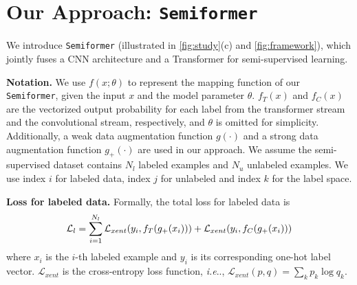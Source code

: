 \documentclass[runningheads]{llncs}
\makeatletter
\DeclareRobustCommand\onedot{\futurelet\@let@token\@onedot}
\def\@onedot{\ifx\@let@token.\else.\null\fi\xspace}
\def\ie{\emph{i.e}\onedot} \def\Ie{\emph{I.e}\onedot}
\newcommand{\fakeparagraph}[1]{\textbf{#1}}
\newcommand*{\system}{\texttt{Semiformer}\@\xspace}
\makeatother
\begin{document}
\section{Our Approach: \system}

We introduce {\system} (illustrated in \cref{fig:study}(c) and \cref{fig:framework}), which jointly fuses a CNN architecture and a Transformer for semi-supervised learning.

\fakeparagraph{Notation.} We use $f(x; \theta)$ to represent the mapping function of our \system, given the input $x$ and the model parameter $\theta$. $f_T(x)$ and $f_C(x)$ are the vectorized output probability for each label from the transformer stream and the convolutional stream, respectively, and $\theta$ is omitted for simplicity.  Additionally, a weak data augmentation function $g(\cdot)$ and a strong data augmentation function $g_+(\cdot)$ are used in our approach. We assume the semi-supervised dataset contains $N_l$ labeled examples and $N_u$ unlabeled examples. We use index $i$ for labeled data, index $j$ for unlabeled and index $k$ for the label space. 

\fakeparagraph{Loss for labeled data.} Formally, the total loss for labeled data is
\begin{equation}
\label{eq:new_loss1}\small
{\mathcal L}_l = \sum_{i=1}^{N_l}\mathcal L_{xent}(y_i,f_T(g_+(x_i)))+\mathcal L_{xent}(y_i,f_C(g_+(x_i))) 
\end{equation}
where $x_i$ is the $i$-th labeled example and $y_i$ is its corresponding one-hot label vector. $\mathcal L_{xent}$ is the cross-entropy loss function, \ie, $\mathcal L_{xent}(p,q)=\sum_k p_k\log q_k$.
\end{document}
